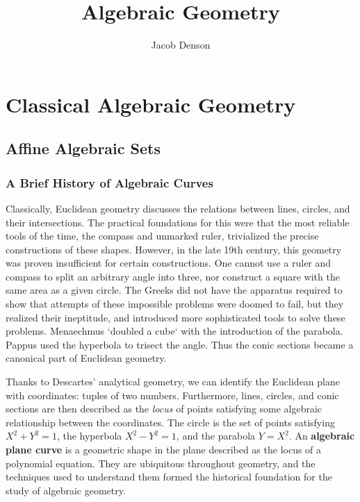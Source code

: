 

\title{Algebraic Geometry}
\author{Jacob Denson}



\maketitle
\tableofcontents
{}

\part{Classical Algebraic Geometry}

\chapter{Affine Algebraic Sets}

\section{A Brief History of Algebraic Curves}

Classically, Euclidean geometry discusses the relations between lines, circles, and their intersections. The practical foundations for this were that the most reliable tools of the time, the compass and unmarked ruler, trivialized the precise constructions of these shapes. However, in the late 19th century, this geometry was proven insufficient for certain constructions. One cannot use a ruler and compass to split an arbitrary angle into three, nor construct a square with the same area as a given circle. The Greeks did not have the apparatus required to show that attempts of these impossible problems were doomed to fail, but they realized their ineptitude, and introduced more sophisticated tools to solve these problems. Menaechmus `doubled a cube` with the introduction of the parabola. Pappus used the hyperbola to trisect the angle. Thus the conic sections became a canonical part of Euclidean geometry.

Thanks to Descartes' analytical geometry, we can identify the Euclidean plane with coordinates: tuples of two numbers. Furthermore, lines, circles, and conic sections are then described as the {\it locus} of points satisfying some algebraic relationship between the coordinates. The circle is the set of points satisfying $X^2 + Y^2 = 1$, the hyperbola $X^2 - Y^2 = 1$, and the parabola $Y = X^2$. An {\bf algebraic plane curve} is a geometric shape in the plane described as the locus of a polynomial equation. They are ubiquitous throughout geometry, and the techniques used to understand them formed the historical foundation for the study of algebraic geometry.

